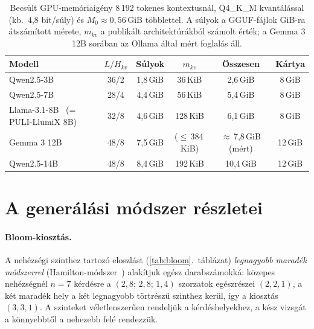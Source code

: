 \begin{table}[htbp]
\centering
\caption[Becsült GPU-memóriaigény (8\,192 tokenes kontextus, Q4\_K\_M kvantálás).]{Becsült
GPU-memóriaigény 8\,192 tokenes kontextusnál, Q4\_K\_M kvantálással (kb.\ 4,8 bit/súly) és
$M_0\approx0{,}56$\,GiB többlettel. A súlyok a GGUF-fájlok GiB-ra átszámított mérete, $m_{kv}$ a
publikált architektúrákból számolt érték; a Gemma 3 12B sorában az Ollama által mért foglalás áll.}
\label{tab:budget}
\small
\setlength{\tabcolsep}{4pt}
\begin{tabular}{@{}lccccc@{}}
\toprule
Modell & $L/H_{kv}$ & Súlyok & $m_{kv}$ & Összesen & Kártya \\
\midrule
Qwen2.5-3B  & 36/2 & 1,8\,GiB & 36\,KiB  & 2,6\,GiB  & 8\,GiB \\
Qwen2.5-7B  & 28/4 & 4,4\,GiB & 56\,KiB  & 5,4\,GiB  & 8\,GiB \\
Llama-3.1-8B~\cite{grattafiori2024llama3} (= PULI-LlumiX 8B) & 32/8 & 4,6\,GiB & 128\,KiB & 6,1\,GiB & 8\,GiB \\
Gemma 3 12B~\cite{gemma3} & 48/8 & 7,5\,GiB & ($\le$\,384\,KiB) & $\approx$\,7,8\,GiB (mért) & 12\,GiB \\
Qwen2.5-14B & 48/8 & 8,4\,GiB & 192\,KiB & 10,4\,GiB & 12\,GiB \\
\bottomrule
\end{tabular}
\end{table}

\section{A generálási módszer részletei}
\label{app-bloom}

\paragraph{Bloom-kiosztás.} A nehézségi szinthez tartozó eloszlást (\ref{tab:bloom}.~táblázat)
\emph{legnagyobb maradék módszerrel} (Hamilton-módszer~\cite{balinski2001fair}) alakítjuk egész
darabszámokká: közepes nehézségnél $n=7$ kérdésre a $(2{,}8;\,2{,}8;\,1{,}4)$ szorzatok egészrészei
$(2,2,1)$, a két maradék hely a két legnagyobb törtrészű szinthez kerül, így a kiosztás $(3,3,1)$. A
szinteket véletlenszerűen rendeljük a kérdéshelyekhez, a kész vizsgát a könnyebbtől a nehezebb felé
rendezzük.

